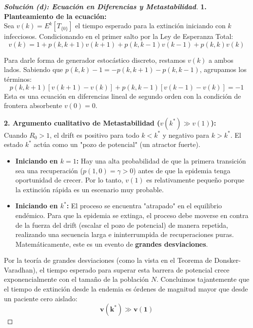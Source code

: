\documentclass[10pt,a4paper]{article}
\begin{document}
\begin{proof}[\textbf{Solución (d): Ecuación en Diferencias y Metastabilidad}]
    \textbf{1. Planteamiento de la ecuación:} \\
    Sea $v(k) = E^k[T_{\{0\}}]$ el tiempo esperado para la extinción iniciando con $k$ infecciosos. Condicionando en el primer salto por la Ley de Esperanza Total:
    \[ v(k) = 1 + p(k, k+1)v(k+1) + p(k, k-1)v(k-1) + p(k,k)v(k) \]
    
    Para darle forma de generador estocástico discreto, restamos $v(k)$ a ambos lados. Sabiendo que $p(k,k) - 1 = -p(k, k+1) - p(k, k-1)$, agrupamos los términos:
    \[ p(k, k+1)[v(k+1) - v(k)] + p(k, k-1)[v(k-1) - v(k)] = -1 \]
    Esta es una ecuación en diferencias lineal de segundo orden con la condición de frontera absorbente $v(0) = 0$.

    \vspace{3mm}
    \textbf{2. Argumento cualitativo de Metastabilidad ($v(k^*) \gg v(1)$):} \\
    Cuando $R_0 > 1$, el drift es positivo para todo $k < k^*$ y negativo para $k > k^*$. El estado $k^*$ actúa como un "pozo de potencial" (un atractor fuerte). 
    
    \begin{itemize}
        \item \textbf{Iniciando en $k=1$:} Hay una alta probabilidad de que la primera transición sea una recuperación ($p(1,0) = \gamma > 0$) antes de que la epidemia tenga oportunidad de crecer. Por lo tanto, $v(1)$ es relativamente pequeño porque la extinción rápida es un escenario muy probable.
        \item \textbf{Iniciando en $k^*$:} El proceso se encuentra "atrapado" en el equilibrio endémico. Para que la epidemia se extinga, el proceso debe moverse en contra de la fuerza del drift (escalar el pozo de potencial) de manera repetida, realizando una secuencia larga e ininterrumpida de recuperaciones puras. Matemáticamente, este es un evento de \textbf{grandes desviaciones}.
    \end{itemize}
    
    Por la teoría de grandes desviaciones (como la vista en el Teorema de Donsker-Varadhan), el tiempo esperado para superar esta barrera de potencial crece exponencialmente con el tamaño de la población $N$. Concluimos tajantemente que el tiempo de extinción desde la endemia es órdenes de magnitud mayor que desde un paciente cero aislado:
    \[ \mathbf{v(k^*) \gg v(1)} \]
\end{proof}
\end{document}
